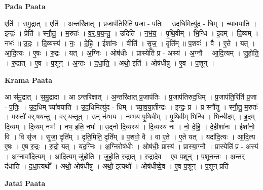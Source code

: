 \documentclass[17pt]{extarticle}
\begin{document}
\textbf{Pada Paata} \newline

एति॑ । स॒मु॒द्रात् । एति॑ । अ॒न्तरि॑क्षात् । प्र॒जाप॑ति॒रिति॑ प्र॒जा - प॒तिः॒ । उ॒द॒धिमित्यु॑द - धिम् । च्या॒व॒या॒ति॒ । इन्द्रः॑ । प्रेति॑ । स्नौ॒तु॒ । म॒रुतः॑ । व॒र्॒.ष॒य॒न्तु॒ । उदिति॑ । न॒भं॒य॒ । पृ॒थि॒वीम् । भि॒न्धि । इ॒दम् । दि॒व्यम् । नभः॑ ॥ उ॒द्रः । दि॒व्यस्य॑ । नः॒ । दे॒हि॒ । ईशा॑नः । वीति॑ । सृ॒ज॒ । दृति᳚म् ॥ प॒शवः॑ । वै । ए॒ते । यत् । आ॒दि॒त्यः । ए॒षः । रु॒द्रः । यत् । अ॒ग्निः । ओष॑धीः । प्रास्येति॑ प्र - अस्य॑ । अ॒ग्नौ । आ॒दि॒त्यम् । जु॒हो॒ति॒ । रु॒द्रात् । ए॒व । प॒शून् । अ॒न्तः । द॒धा॒ति॒ । अथो॒ इति॑ । ओष॑धीषु । ए॒व । प॒शून् ।  \newline


\textbf{Krama Paata} \newline

आ स॑मु॒द्रात् । स॒मु॒द्रादा । आ ऽन्तरि॑क्षात् । अ॒न्तरि॑क्षात् प्र॒जाप॑तिः । प्र॒जाप॑तिरुद॒धिम् । प्र॒जाप॑ति॒रिति॑ प्र॒जा - प॒तिः॒ । उ॒द॒धिम् च्या॑वयाति । उ॒द॒धिमित्यु॑द - धिम् । च्या॒व॒या॒तीन्द्रः॑ । इन्द्रः॒ प्र । प्र स्नौ॑तु । स्नौ॒तु॒ म॒रुतः॑ । म॒रुतो॑ वर्.षयन्तु । व॒र्॒.य॒न्तूत् । उन् न॑म्भय । न॒म्भ॒य॒ पृ॒थि॒वीम् । पृ॒थि॒वीम् भि॒न्धि । भि॒न्धीदम् । इ॒दम् दि॒व्यम् । दि॒व्यम् नभः॑ । नभ॒ इति॒ नभः॑ ॥ उ॒द्नो दि॒व्यस्य॑ । दि॒व्यस्य॑ नः । नो॒ दे॒हि॒ । दे॒हीशा॑नः । ईशा॑नो॒ वि । वि सृ॑ज । सृ॒जा॒ दृति᳚म् । दृति॒मिति॒ दृति᳚म् ॥ प॒शवो॒ वै । वा ए॒ते । ए॒ते यत् । यदा॑दि॒त्यः । आ॒दि॒त्य ए॒षः । ए॒ष रु॒द्रः । रु॒द्रो यत् । यद॒ग्निः । अ॒ग्निरोष॑धीः । ओष॑धीः॒ प्रास्य॑ । प्रास्या॒ग्नौ । प्रास्येति॑ प्र - अस्य॑ । अ॒ग्नावा॑दि॒त्यम् । आ॒दि॒त्यम् जु॑होति । जु॒हो॒ति॒ रु॒द्रात् । रु॒द्रादे॒व । ए॒व प॒शून् । प॒शून॒न्तः । अ॒न्तर् द॑धाति । द॒धा॒त्यथो᳚ । अथो॒ ओष॑धीषु । अथो॒ इत्यथो᳚ । ओष॑धीष्वे॒व । ए॒व प॒शून् । प॒शून् प्रति॑ \newline

\textbf{Jatai Paata} \newline
\end{document}
